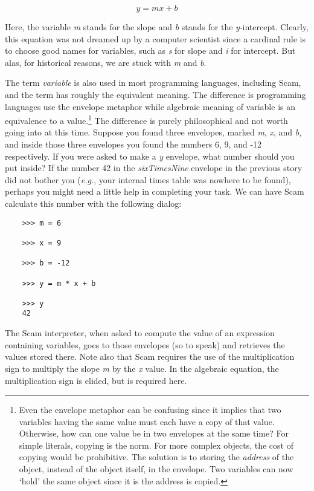     \[  y = mx + b \]

Here,
the variable {\it m} stands for the slope and {\it b} stands for the
{\it y}-intercept.
Clearly,
this equation was not dreamed up by a computer
scientist since a cardinal rule is to choose good names for variables,
such as {\it s} for slope and {\it i} for intercept.
But alas,
for historical reasons,
we are stuck with {\it m} and {\it b}.

The term {\it variable} is also used in most programming languages,
including
Scam,
and the term has roughly the equivalent meaning.
The difference is
programming languages use the envelope metaphor
while algebraic meaning of variable is an equivalence to a value.\footnote{
Even the envelope metaphor can be confusing since it
implies that two variables having the same value must
each have a copy of that value. Otherwise, how can one value
be in two envelopes at the same time? For simple literals, copying is
the norm.
For more complex objects, the cost of copying would
be prohibitive.
The solution is to storing the {\it address} of the object,
instead of the object itself, in the envelope. Two variables can
now `hold' the same object since it is the address is copied.
}
The difference is purely philosophical and not worth going into at this
time.
Suppose you found three envelopes,
marked {\it m}, {\it x}, and {\it b},
and inside
those three envelopes you found the numbers 6, 9, and -12 respectively.
If
you were asked to make a {\it y} envelope,
what number should you put inside?
If
the number 42 in the {\it sixTimesNine} envelope in the previous story did not
bother you ({\it e.g.}, your internal times table was nowhere to be found),
perhaps you might need a little help in completing your task.
We can
have Scam calculate this number with the following dialog:

\begin{verbatim}
    >>> m = 6
    
    >>> x = 9  
    
    >>> b = -12
    
    >>> y = m * x + b
    
    >>> y
    42
\end{verbatim}

The Scam interpreter,
when asked to compute the value of an expression containing variables,
goes to those envelopes (so to speak) and
retrieves the values stored there.
Note also that Scam
requires the use of the multiplication sign
to multiply the slope {\it m} by the {\it x} value.
In the algebraic equation,
the multiplication sign is elided,
but is required here.

